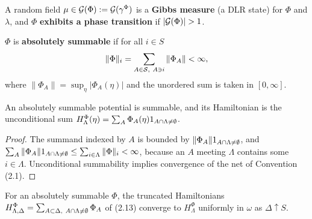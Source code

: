 \begin{remark}
    \label{rmk:pot-gibbs-measures}

    A random field $\mu \in \mathcal{G}(\Phi) := \mathcal{G}(\gamma^\Phi)$ is a \textbf{Gibbs
    measure} (a DLR state) for $\Phi$ and $\lambda$, and $\Phi$ \textbf{exhibits a phase
    transition} if $|\mathcal{G}(\Phi)| > 1$.
\end{remark}

\begin{definition}
    \label{def:pot-abs-summable}
    \leanok

    $\Phi$ is \textbf{absolutely summable} if for all $i \in S$
    \[ \|\Phi\|_i = \sum_{A \in \mathcal{S},\ A \ni i} \|\Phi_A\| < \infty , \]
    where $\|\Phi_A\| = \sup_\eta |\Phi_A(\eta)|$ and the unordered sum is taken in
    $[0, \infty]$.
\end{definition}

\begin{lemma}
    \label{lem:pot-abs-summable-summable}
    \leanok

    An absolutely summable potential is summable, and its Hamiltonian is the unconditional
    sum $H_\Lambda^\Phi(\eta) = \sum_A \Phi_A(\eta) 1_{A \cap \Lambda \neq \emptyset}$.
\end{lemma}
\begin{proof}
    \leanok

    The summand indexed by $A$ is bounded by $\|\Phi_A\| 1_{A \cap \Lambda \neq \emptyset}$,
    and $\sum_A \|\Phi_A\| 1_{A \cap \Lambda \neq \emptyset} \leq \sum_{i \in \Lambda}
    \|\Phi\|_i < \infty$, because an $A$ meeting $\Lambda$ contains some $i \in \Lambda$.
    Unconditional summability implies convergence of the net of Convention (2.1).
\end{proof}

\begin{remark}
    \label{rmk:pot-uniform-convergence}

    For an absolutely summable $\Phi$, the truncated Hamiltonians $H^\Phi_{\Lambda, \Delta} =
    \sum_{A \subset \Delta,\ A \cap \Lambda \neq \emptyset} \Phi_A$ of (2.13) converge to
    $H^\Phi_\Lambda$ uniformly in $\omega$ as $\Delta \uparrow S$.
\end{remark}

